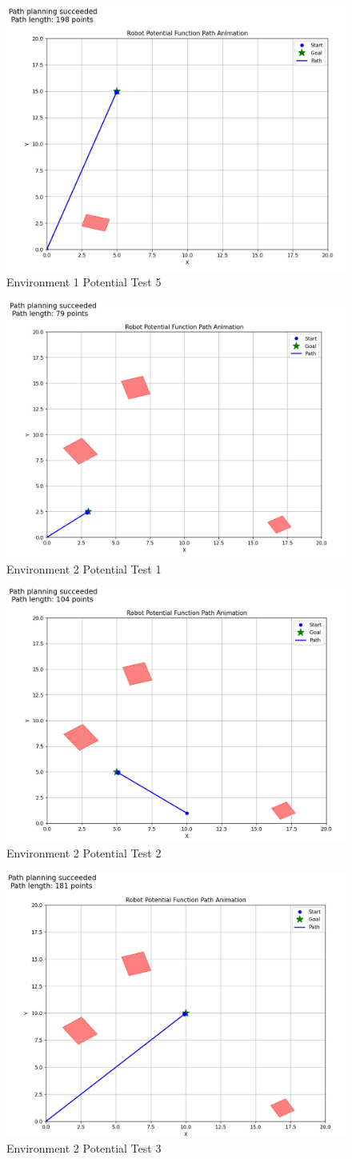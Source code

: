 \documentclass{article}
\begin{document}
\begin{figure} [H]
    \centering
    \includegraphics[width=0.5\linewidth]{latex_media/Env1PotentialTest5.jpg}
    \caption{Environment 1 Potential Test 5}
\end{figure}

\begin{figure} [H]
    \centering
    \includegraphics[width=0.5\linewidth]{latex_media/Env2PotentialTest1.jpg}
    \caption{Environment 2 Potential Test 1}
\end{figure}

\begin{figure} [H]
    \centering
    \includegraphics[width=0.5\linewidth]{latex_media/Env2PotentialTest2.jpg}
    \caption{Environment 2 Potential Test 2}
\end{figure}

\begin{figure} [H]
    \centering
    \includegraphics[width=0.5\linewidth]{latex_media/Env2PotentialTest3.jpg}
    \caption{Environment 2 Potential Test 3}
\end{figure}
\end{document}

